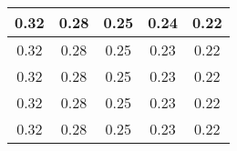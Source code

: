 \begin{large}\begin{tabular}{|c|c|c|c|c|}
\hline
0.32&0.28&0.25&0.24&0.22\\\hline
0.32&0.28&0.25&0.23&0.22\\\hline
0.32&0.28&0.25&0.23&0.22\\\hline
0.32&0.28&0.25&0.23&0.22\\\hline
0.32&0.28&0.25&0.23&0.22\\\hline
\end{tabular}
\end{large}